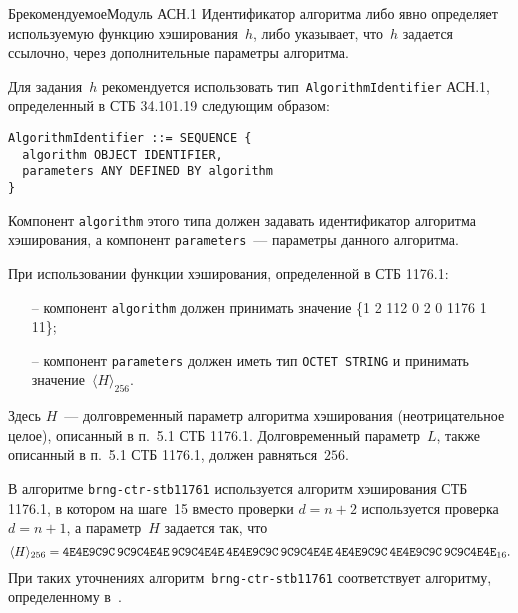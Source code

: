\begin{appendix}{Б}{рекомендуемое}{Модуль АСН.1}
Идентификатор алгоритма либо явно определяет используемую функцию хэширования~$h$,
либо указывает, что~$h$ задается ссылочно, через дополнительные параметры алгоритма.

Для задания~$h$ рекомендуется использовать 
тип~\texttt{AlgorithmIdentifier} АСН.1,
определенный в СТБ 34.101.19 следующим образом:
\begin{verbatim}
AlgorithmIdentifier ::= SEQUENCE {
  algorithm OBJECT IDENTIFIER,
  parameters ANY DEFINED BY algorithm	 
}
\end{verbatim}
%
Компонент \verb|algorithm| этого типа должен задавать идентификатор 
алгоритма хэширования, а компонент \verb|parameters|~--- 
параметры данного алгоритма. 

При использовании функции хэширования, определенной в СТБ 1176.1:
\begin{itemize} 
\item[--]
компонент \texttt{algorithm} должен принимать значение 
\{1 2 112 0 2 0 1176 1 11\};
\item[--]
компонент \texttt{parameters} должен иметь тип \texttt{OCTET STRING}
и принимать значение~$\langle H\rangle_{256}$.
\end{itemize}
%
Здесь $H$~--- долговременный параметр алгоритма хэширования
(неотрицательное целое), 
описанный в п.~5.1 СТБ 1176.1. 
Долговременный параметр~$L$, также описанный в п.~5.1 СТБ 1176.1, 
должен равняться~$256$.

В алгоритме \texttt{brng-ctr-stb11761} используется алгоритм
хэширования СТБ 1176.1, в котором на шаге~15 
вместо проверки $d=n+2$ используется проверка $d=n+1$,
а параметр~$H$ задается так, что
$$
\langle H\rangle_{256}=
\texttt{4E4E9C9C\,9C9C4E4E\,9C9C4E4E\,4E4E9C9C\,9C9C4E4E\,4E4E9C9C\,4E4E9C9C\,9C9C4E4E}_{16}.
$$
При таких уточнениях алгоритм~\texttt{brng-ctr-stb11761}
соответствует алгоритму, определенному в~\cite{RD-PRNG}.




\end{appendix}

